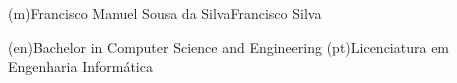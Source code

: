 %
%
%
%
%
%






%
%
\ntauthorname(m){Francisco Manuel Sousa da Silva}{Francisco Silva}



%
%
%
\ntauthordegree(en){Bachelor in Computer Science and Engineering}
\ntauthordegree(pt){Licenciatura em Engenharia Informática}



%
%
%

